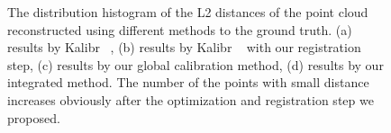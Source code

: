 \begin{figure}[ht]
  \centering
{}%
\caption{The distribution histogram of the L2 distances of the point cloud reconstructed using different methods to the ground truth. (a) results by Kalibr ~\cite{Maye2013Self}, (b) results by Kalibr ~\cite{Maye2013Self} with our registration step, (c) results by our global calibration method, (d) results by our integrated method. The number of the points with small distance increases obviously after the optimization and registration step we proposed.}
\label{fig:histogram}
\end{figure}

